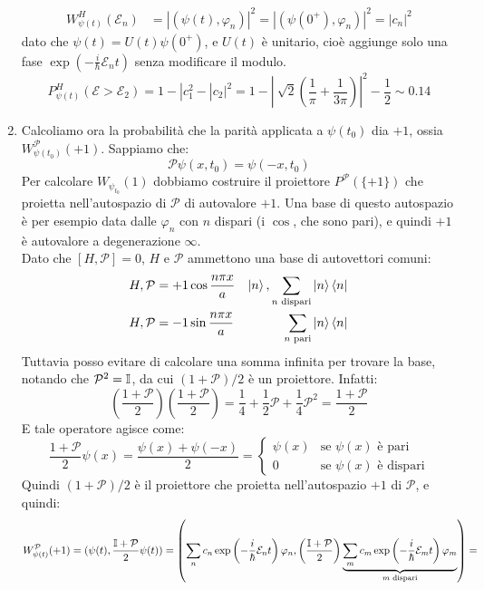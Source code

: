 \documentclass[../../FisicaTeorica.tex]{subfiles}
\begin{document}
\begin{enumerate}
\begin{align*}
W^H_{\psi(t)}(\mathcal{E}_n) &= |(\psi(t),\varphi_n)|^2 = |(\psi(0^+),\varphi_n)|^2 = |c_n|^2
\end{align*}
dato che $\psi(t)=U(t)\psi(0^+)$, e $U(t)$ è unitario, cioè aggiunge solo una fase $\exp\left(-\frac{i}{\hbar}\mathcal{E}_n t\right)$ senza modificare il modulo.
\[
P_{\psi(t)}^H(\mathcal{E}>\mathcal{E}_2)=1-|c_1^2-|c_2|^2=1-\left|\ \sqrt{2}\left(\frac{1}{\pi}+\frac{1}{3\pi}\right)
\right|^2 -\frac{1}{2} \sim 0.14
\]
\item Calcoliamo ora la probabilità che la parità applicata a $\psi(t_0)$ dia $+1$, ossia $W_{\psi(t_0)}^\mathcal{P}(+1)$. Sappiamo che:
\[
\mathcal{P}\psi(x,t_0)=\psi(-x,t_0)
\]
Per calcolare $W_{\psi_{t_0}}(1)$ dobbiamo costruire il proiettore $P^\mathcal{P}(\{+1\})$ che proietta nell'autospazio di $\mathcal{P}$ di autovalore $+1$. Una base di questo autospazio è per esempio data dalle $\varphi_n$ con $n$ dispari (i $\cos$, che sono pari), e quindi $+1$ è autovalore a degenerazione $\infty$.\\
Dato che $[H,\mathcal{P}]=0$, $H$ e $\mathcal{P}$ ammettono una base di autovettori comuni:
\begin{align*}
H, \mathcal{P}=+1 & \cos \frac{n\pi x}{a} & \ket{n}, \sum_{n \text{ dispari}}\ket{n}\bra{n}\\
H, \mathcal{P}=-1 & \sin\frac{n\pi x}{a} & \sum_{n \text{ pari}} \ket{n}\bra{n}
\end{align*}
Tuttavia posso evitare di calcolare una somma infinita per trovare la base, notando che $\mathcal{P}^2=\mathbb{I}$, da cui $(1+\mathcal{P})/2$ è un proiettore. Infatti:
\[
\left(\frac{1+\mathcal{P}}{2}\right) \left(\frac{1+\mathcal{P}}{2}\right)=\frac{1}{4}+\frac{1}{2}\mathcal{P}+\frac{1}{4}\mathcal{P}^2=\frac{1+\mathcal{P}}{2}
\]
E tale operatore agisce come:
\[
\frac{1+\mathcal{P}}{2}\psi(x)=\frac{\psi(x)+\psi(-x)}{2} = \begin{cases}
\psi(x) & \text{se $\psi(x)$ è pari}\\
0 & \text{se $\psi(x)$ è dispari}
\end{cases}
\]
Quindi $(1+\mathcal{P})/2$ è il proiettore che proietta nell'autospazio $+1$ di $\mathcal{P}$, e quindi:
\begin{align*}
W_{\psi(t)}^\mathcal{P}(+1)&=(\psi(t),\frac{\bb{I}+\mathcal{P}}{2}\psi(t))=\left(
\sum_n c_n \exp\left(-\frac{i}{\hbar}\mathcal{E}_n t\right) \varphi_n, \left(\frac{\bb{I}+\mathcal{P}}{2}\right)\underbrace{
\sum_m c_m \exp\left(-\frac{i}{\hbar}\mathcal{E}_m t\right) \varphi_m}_{m \text{ dispari}} \right) = \\

\end{align*}
\end{enumerate}
\end{document}
